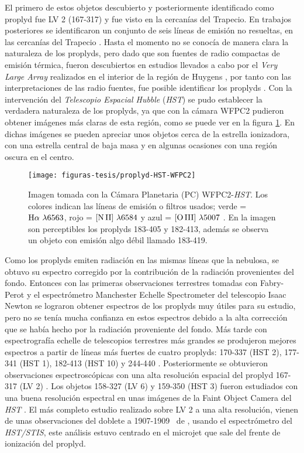 El primero de estos objetos descubierto y posteriormente identificado como proplyd fue LV 2 (167-317) y fue visto en la cercanías del Trapecio. En trabajos posteriores se identificaron un conjunto de seis líneas de emisión no resueltas, en las cercanías del Trapecio \citep{Laques:1979}. Hasta el momento no se conocía de manera clara la naturaleza de los proplyds, pero dado que son fuentes de radio compactas de emisión térmica, fueron descubiertos en estudios llevados a cabo por el \textit{Very Large Array} realizados en el interior de la región de Huygens \citep{Garay:1987}, por tanto con las interpretaciones de las radio fuentes, fue posible identificar los proplyds \citep{Churchwell:1987}. Con la intervención del \textit{Telescopio Espacial Hubble} (\textit{HST}) se pudo establecer la verdadera naturaleza de los proplyds, ya que con la cámara WFPC2 \citep{Odell:1994} pudieron obtener imágenes más claras de esta región, como se puede ver en la figura \ref{fig:proplyd-hst}. En dichas imágenes se pueden apreciar unos objetos cerca de la estrella ionizadora, con una estrella central de baja masa y en algunas ocasiones con una región oscura en el centro.\\ 

\begin{figure}
  \centering
  \texttt{[image: figuras-tesis/proplyd-HST-WFPC2]}
  \caption{Imagen tomada con la Cámara Planetaria (PC) WFPC2-\textit{HST}. Los colores indican las líneas de emisión o filtros usados;  verde = \(\mathrm{H}\alpha~\lambda6563\), rojo =  \(\mathrm{[N\,II]}~\lambda6584\) y  azul = \(\mathrm{[O\,III]}~\lambda5007\) \citep{Bally:1998a}. En la imagen son perceptibles los proplyds 183-405 y 182-413, además se observa un objeto con emisión algo débil llamado 183-419.}
  \label{fig:proplyd-hst}
\end{figure}
  
Como los proplyds emiten radiación en las mismas líneas que la nebulosa, se obtuvo su espectro corregido por la contribución de la radiación provenientes del fondo. Entonces con las primeras observaciones terrestres tomadas con Fabry-Perot \citep{Fuente:2003} y el espectrómetro Manchester Echelle Spectrometer del telescopio Isaac Newton \citep{Henney:1997} se lograron obtener espectros de los proplyds muy útiles para su estudio, pero no se tenía mucha confianza en estos espectros debido a la alta corrección que se había hecho por la radiación proveniente del fondo. Más tarde con espectrografía echelle de telescopios terrestres más grandes se produjeron mejores espectros a partir de líneas más fuertes de cuatro proplyds: 170-337 (HST 2), 177-341 (HST 1), 182-413 (HST 10) y 244-440 \citep{Henney:1999a}. Posteriormente se obtuvieron observaciones espectroscópicas con una alta resolución espacial del proplyd 167-317 (LV 2) \citep{Vasconcelos:2005}. Los objetos 158-327 (LV 6) y 159-350 (HST 3) fueron estudiados con una buena resolución espectral en unas imágenes de la Faint Object Camera del \textit{HST} \citep{Bally:1998a}. El más completo estudio realizado sobre  LV 2  a una alta resolución, vienen de unas observaciones \citep{Henney:2002a} del doblete a 1907-1909~\A{} de \ciii{}, usando el espectrómetro del \textit{HST/STIS}, este análisis estuvo centrado en el microjet que sale del frente de ionización del proplyd.    

